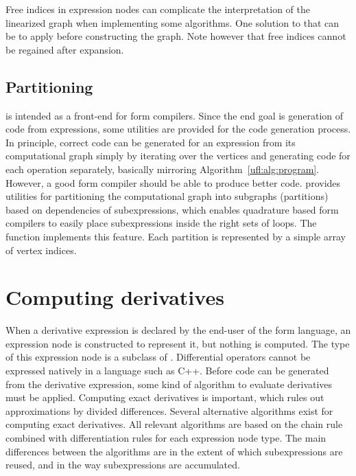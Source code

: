 Free indices in expression nodes can complicate the interpretation of
the linearized graph when implementing some algorithms.  One solution
to that can be to apply  before constructing
the graph. Note however that free indices cannot be regained after
expansion.

\subsection{Partitioning}

\ufl{} is intended as a front-end for form compilers.  Since the end
goal is generation of code from expressions, some utilities are
provided for the code generation process.  In principle, correct code
can be generated for an expression from its computational graph simply
by iterating over the vertices and generating code for each operation
separately, basically mirroring Algorithm~\ref{ufl:alg:program}.
However, a good form compiler should be able to produce better code.
\ufl{} provides utilities for partitioning the computational graph
into subgraphs (partitions) based on dependencies of subexpressions,
which enables quadrature based form compilers to easily place
subexpressions inside the right sets of loops.  The function
 implements this feature.  Each partition is
represented by a simple array of vertex indices.


\section{Computing derivatives} \label{ufl:sec:ad}

When a derivative expression is declared by the end-user of the form
language, an expression node is constructed to represent it, but
nothing is computed.  The type of this expression node is a subclass
of .  Differential operators cannot be expressed
natively in a language such as C++.  Before code can be generated from
the derivative expression, some kind of algorithm to evaluate
derivatives must be applied.  Computing exact derivatives is
important, which rules out approximations by divided differences.
Several alternative algorithms exist for computing exact
derivatives. All relevant algorithms are based on the chain rule
combined with differentiation rules for each expression node type.
The main differences between the algorithms are in the extent of which
subexpressions are reused, and in the way subexpressions are
accumulated.

